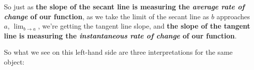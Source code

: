 \documentclass[pdftex, brazil, 12pt, twoside]{article}
\begin{document}
\begin{figure}[H]
  \begin{center}
  \end{center}
\end{figure}

So just as \textbf{the slope of the secant line
is measuring the \emph{average rate of change} of our function},
as we take the limit of the secant line as $b$ approaches $a$, $\displaystyle \lim_{b \to a}$,
we're getting the tangent line slope, and \textbf{the slope of the tangent line
is measuring the \emph{instantaneous rate of change}
of our function}.

\begin{figure}[H]
  \begin{center}
  \end{center}
\end{figure}

So what we see on this left-hand side
are three interpretations for the same object:
\end{document}
